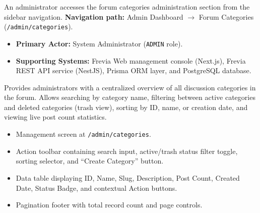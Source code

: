 An administrator accesses the forum categories administration section from the sidebar navigation.\newline
\textbf{Navigation path:} Admin Dashboard $\rightarrow$ Forum Categories (\texttt{/admin/categories}).


\begin{itemize}[leftmargin=1.6em,topsep=3pt,itemsep=2pt,parsep=0pt,label=$\bullet$]
    \item \textbf{Primary Actor:} System Administrator (\texttt{ADMIN} role).
    \item \textbf{Supporting Systems:} Frevia Web management console (Next.js), Frevia REST API service (NestJS), Prisma ORM layer, and PostgreSQL database.
\end{itemize}

\noindent Provides administrators with a centralized overview of all discussion categories in the forum. Allows searching by category name, filtering between active categories and deleted categories (trash view), sorting by ID, name, or creation date, and viewing live post count statistics.

\begin{itemize}[leftmargin=1.6em,topsep=3pt,itemsep=2pt,parsep=0pt,label=$\bullet$]
    \item Management screen at \texttt{/admin/categories}.
    \item Action toolbar containing search input, active/trash status filter toggle, sorting selector, and ``Create Category'' button.
    \item Data table displaying ID, Name, Slug, Description, Post Count, Created Date, Status Badge, and contextual Action buttons.
    \item Pagination footer with total record count and page controls.
\end{itemize}

